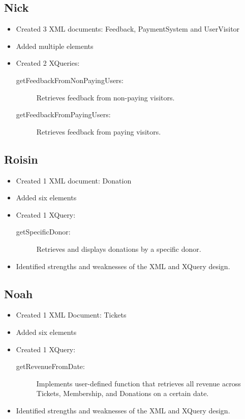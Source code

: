 \documentclass{article} %
\begin{document}
\subsection{Nick}
\begin{itemize}
    \item Created 3 XML documents: Feedback, PaymentSystem and UserVisitor
    \item Added multiple elements 
    \item Created 2 XQueries: 
    \begin{description}
        \item[getFeedbackFromNonPayingUsers:] Retrieves feedback from non-paying visitors.
        \item[getFeedbackFromPayingUsers:] Retrieves feedback from paying visitors.
    \end{description}
\end{itemize}

\subsection{Roisin}
\begin{itemize}
    \item Created 1 XML document: Donation
    \item Added six elements 
    \item Created 1 XQuery: 
    \begin{description}
        \item[getSpecificDonor:] Retrieves and displays donations by a specific donor.
    \end{description}
    \item Identified strengths and weaknesses of the XML and XQuery design.
\end{itemize}

\subsection{Noah}
\begin{itemize}
    \item Created 1 XML Document: Tickets
    \item Added six elements 
    \item Created 1 XQuery: 
    \begin{description}
        \item[getRevenueFromDate:] Implements user-defined function that retrieves all revenue across Tickets, Membership, and Donations on a certain date.
    \end{description}
    \item Identified strengths and weaknesses of the XML and XQuery design.
\end{itemize}
\end{document}
